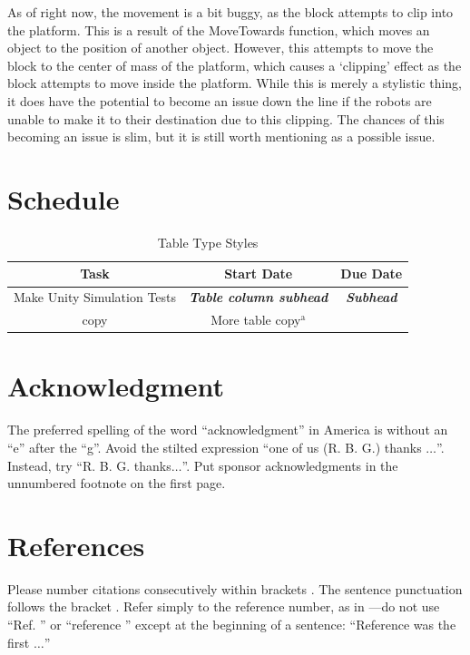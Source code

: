 \documentclass[conference]{IEEEtran}
\begin{document}
As of right now, the movement is a bit buggy, as the block attempts to clip into the platform. This is a result of the MoveTowards function, which moves an object to the position of another object. However, this attempts to move the block to the center of mass of the platform, which causes a ‘clipping’ effect as the block attempts to move inside the platform. While this is merely a stylistic thing, it does have the potential to become an issue down the line if the robots are unable to make it to their destination due to this clipping. The chances of this becoming an issue is slim, but it is still worth mentioning as a possible issue.

\section{Schedule}
\begin{table}[htbp]
\caption{Table Type Styles}
\begin{center}
\begin{tabular}{|c|c|c|}
\hline
\textbf{Task} & \textbf{Start Date} & \textbf{Due Date} \\
\hline
Make Unity Simulation Tests & \textbf{\textit{Table column subhead}}& \textbf{\textit{Subhead}} \\
\hline
copy& More table copy$^{\mathrm{a}}$& \\
\hline
\end{tabular}
\label{tab1}
\end{center}
\end{table}

\section*{Acknowledgment}

The preferred spelling of the word ``acknowledgment'' in America is without 
an ``e'' after the ``g''. Avoid the stilted expression ``one of us (R. B. 
G.) thanks $\ldots$''. Instead, try ``R. B. G. thanks$\ldots$''. Put sponsor 
acknowledgments in the unnumbered footnote on the first page.

\section*{References}

Please number citations consecutively within brackets \cite{b1}. The 
sentence punctuation follows the bracket \cite{b2}. Refer simply to the reference 
number, as in \cite{b3}---do not use ``Ref. \cite{b3}'' or ``reference \cite{b3}'' except at 
the beginning of a sentence: ``Reference \cite{b3} was the first $\ldots$''
\end{document}

